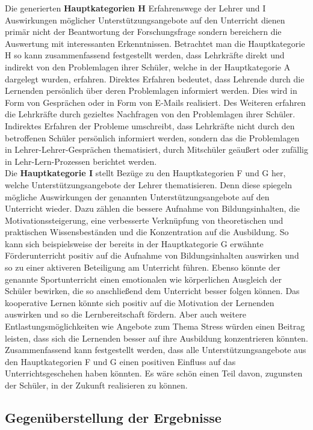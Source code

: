 \noindent
Die generierten \textbf{Hauptkategorien H} Erfahrenswege der Lehrer und I Auswirkungen möglicher Unterstützungsangebote auf den Unterricht dienen primär nicht der Beantwortung der Forschungsfrage sondern bereichern die Auswertung mit interessanten Erkenntnissen. Betrachtet man die Hauptkategorie H so kann zusammenfassend festgestellt werden, dass Lehrkräfte direkt und indirekt von den Problemlagen ihrer Schüler, welche in der Hauptkategorie A dargelegt wurden, erfahren. Direktes Erfahren bedeutet, dass Lehrende durch die Lernenden persönlich über deren Problemlagen informiert werden. Dies wird in Form von Gesprächen oder in Form von E-Mails realisiert. Des Weiteren erfahren die Lehrkräfte durch gezieltes Nachfragen von den Problemlagen ihrer Schüler. Indirektes Erfahren der Probleme umschreibt, dass Lehrkräfte nicht durch den betroffenen Schüler persönlich informiert werden, sondern das die Problemlagen in Lehrer-Lehrer-Gesprächen thematisiert, durch Mitschüler geäußert oder zufällig in Lehr-Lern-Prozessen berichtet werden.\\

\noindent
Die \textbf{Hauptkategorie I} stellt Bezüge zu den Hauptkategorien F und G her, welche Unterstützungsangebote der Lehrer thematisieren. Denn diese spiegeln mögliche Auswirkungen der genannten Unterstützungsangebote auf den Unterricht wieder. Dazu zählen die bessere Aufnahme von Bildungsinhalten, die Motivationssteigerung, eine verbesserte Verknüpfung von theoretischen und praktischen Wissensbeständen und die Konzentration auf die Ausbildung. So kann sich beispielsweise der bereits in der Hauptkategorie G erwähnte Förderunterricht positiv auf die Aufnahme von Bildungsinhalten auswirken und so zu einer aktiveren Beteiligung am Unterricht führen. Ebenso könnte der genannte Sportunterricht einen emotionalen wie körperlichen Ausgleich der Schüler bewirken, die so anschließend dem Unterricht besser folgen können. Das kooperative Lernen könnte sich positiv auf die Motivation der Lernenden auswirken und so die Lernbereitschaft fördern. Aber auch weitere Entlastungsmöglichkeiten wie Angebote zum Thema Stress würden einen Beitrag leisten, dass sich die Lernenden besser auf ihre Ausbildung konzentrieren könnten. Zusammenfassend kann festgestellt werden, dass alle Unterstützungsangebote aus den Hauptkategorien F und G einen positiven Einfluss auf das Unterrichtsgeschehen haben könnten. Es wäre schön einen Teil davon, zugunsten der Schüler, in der Zukunft realisieren zu können.

\subsection{Gegenüberstellung der Ergebnisse}
\label{sec:GegenüberstellungDerErgebnisse}


